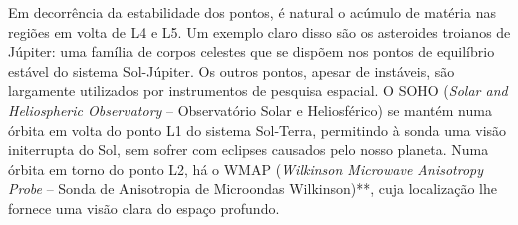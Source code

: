 Em decorrência da estabilidade dos pontos, é natural o acúmulo de matéria nas regiões em volta de L4 e L5. Um exemplo claro disso são os asteroides troianos de Júpiter: uma família de corpos celestes que se dispõem nos pontos de equilíbrio estável do sistema Sol-Júpiter. Os outros pontos, apesar de instáveis, são largamente utilizados por instrumentos de pesquisa espacial. O SOHO (\emph{Solar and Heliospheric Observatory} -- Observatório Solar e Heliosférico) \cite{} se mantém numa órbita em volta do ponto L1 do sistema Sol-Terra, permitindo à sonda uma visão initerrupta do Sol, sem sofrer com eclipses causados pelo nosso planeta. Numa órbita em torno do ponto L2, há o WMAP (\emph{Wilkinson Microwave Anisotropy Probe} -- Sonda de Anisotropia de Microondas Wilkinson)**, cuja localização lhe fornece uma visão clara do espaço profundo.



